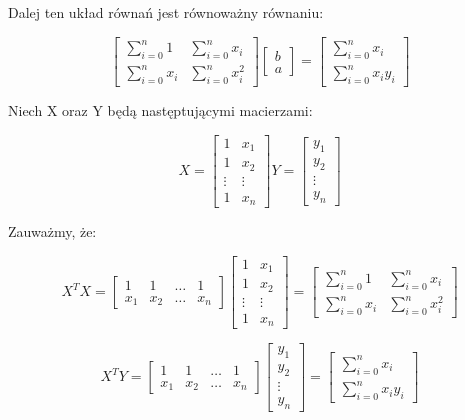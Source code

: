 \documentclass[11pt,wide]{mwart}
\begin{document}
Dalej ten układ równań jest równoważny równaniu:

\begin{equation}
\begin{bmatrix} \sum_{i = 0}^n 1 & \sum_{i = 0}^n x_i \\ \sum_{i = 0}^n x_i & \sum_{i = 0}^n x_i^2 \end{bmatrix}
\begin{bmatrix} b \\ a \end{bmatrix}
=
\begin{bmatrix} \sum_{i = 0}^n x_i \\ \sum_{i = 0}^n x_i y_i \end{bmatrix}
\end{equation}

Niech X oraz Y będą następtującymi macierzami:

\begin{equation}
X = \begin{bmatrix} 1 & x_1 \\ 1 & x_2 \\ \vdots & \vdots \\ 1 & x_n \end{bmatrix}
Y = \begin{bmatrix} y_1 \\ y_2 \\ \vdots \\ y_n \end{bmatrix}
\end{equation}

Zauważmy, że:

\begin{equation}
X^T X = \begin{bmatrix} 1 & 1 & \dots & 1 \\ x_1 & x_2 & \dots & x_n \end{bmatrix}
\begin{bmatrix} 1 & x_1 \\ 1 & x_2 \\ \vdots & \vdots \\ 1 & x_n \end{bmatrix}
= \begin{bmatrix} \sum_{i = 0}^n 1 & \sum_{i = 0}^n x_i \\ \sum_{i = 0}^n x_i & \sum_{i = 0}^n x_i^2 \end{bmatrix}
\end{equation}

\begin{equation}
X^T Y = \begin{bmatrix} 1 & 1 & \dots & 1 \\ x_1 & x_2 & \dots & x_n \end{bmatrix}
\begin{bmatrix} y_1 \\ y_2 \\ \vdots \\ y_n \end{bmatrix} 
= \begin{bmatrix} \sum_{i = 0}^n x_i \\ \sum_{i = 0}^n x_i y_i \end{bmatrix}
\end{equation}
\end{document}
